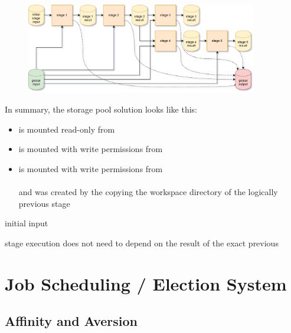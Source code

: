 \begin{figure}[H]
	\centering
	\includegraphics[width=0.9\textwidth]{stage-storage.png}
\end{figure}

In summary, the storage pool solution looks like this:

\begin{itemize}
	\item {} is mounted read-only from \\ 
	\item {} is mounted with write permissions from \\ 
	\item {} is mounted with write permissions from \\  \\
	and was created by the copying the workspace directory of the logically previous stage
\end{itemize}




initial input

stage execution does not need to depend on the result of the exact previous



\section{Job Scheduling / Election System}
\label{design:election}

\subsection{Affinity and Aversion}
\label{election:affinity_and_aversion} 

